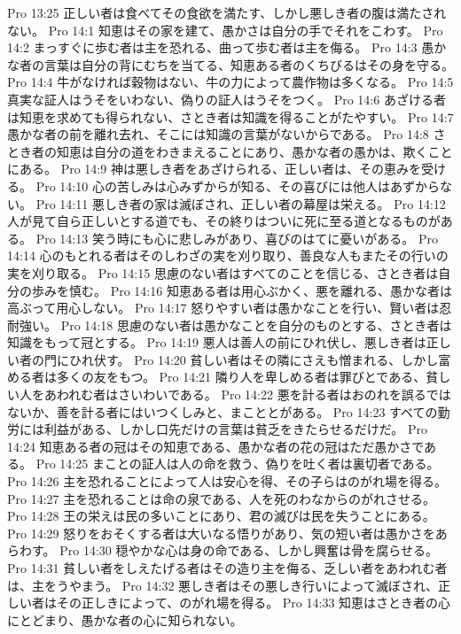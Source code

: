 Pro 13:25  正しい者は食べてその食欲を満たす、しかし悪しき者の腹は満たされない。
Pro 14:1  知恵はその家を建て、愚かさは自分の手でそれをこわす。
Pro 14:2  まっすぐに歩む者は主を恐れる、曲って歩む者は主を侮る。
Pro 14:3  愚かな者の言葉は自分の背にむちを当てる、知恵ある者のくちびるはその身を守る。
Pro 14:4  牛がなければ穀物はない、牛の力によって農作物は多くなる。
Pro 14:5  真実な証人はうそをいわない、偽りの証人はうそをつく。
Pro 14:6  あざける者は知恵を求めても得られない、さとき者は知識を得ることがたやすい。
Pro 14:7  愚かな者の前を離れ去れ、そこには知識の言葉がないからである。
Pro 14:8  さとき者の知恵は自分の道をわきまえることにあり、愚かな者の愚かは、欺くことにある。
Pro 14:9  神は悪しき者をあざけられる、正しい者は、その恵みを受ける。
Pro 14:10  心の苦しみは心みずからが知る、その喜びには他人はあずからない。
Pro 14:11  悪しき者の家は滅ぼされ、正しい者の幕屋は栄える。
Pro 14:12  人が見て自ら正しいとする道でも、その終りはついに死に至る道となるものがある。
Pro 14:13  笑う時にも心に悲しみがあり、喜びのはてに憂いがある。
Pro 14:14  心のもとれる者はそのしわざの実を刈り取り、善良な人もまたその行いの実を刈り取る。
Pro 14:15  思慮のない者はすべてのことを信じる、さとき者は自分の歩みを慎む。
Pro 14:16  知恵ある者は用心ぶかく、悪を離れる、愚かな者は高ぶって用心しない。
Pro 14:17  怒りやすい者は愚かなことを行い、賢い者は忍耐強い。
Pro 14:18  思慮のない者は愚かなことを自分のものとする、さとき者は知識をもって冠とする。
Pro 14:19  悪人は善人の前にひれ伏し、悪しき者は正しい者の門にひれ伏す。
Pro 14:20  貧しい者はその隣にさえも憎まれる、しかし富める者は多くの友をもつ。
Pro 14:21  隣り人を卑しめる者は罪びとである、貧しい人をあわれむ者はさいわいである。
Pro 14:22  悪を計る者はおのれを誤るではないか、善を計る者にはいつくしみと、まこととがある。
Pro 14:23  すべての勤労には利益がある、しかし口先だけの言葉は貧乏をきたらせるだけだ。
Pro 14:24  知恵ある者の冠はその知恵である、愚かな者の花の冠はただ愚かさである。
Pro 14:25  まことの証人は人の命を救う、偽りを吐く者は裏切者である。
Pro 14:26  主を恐れることによって人は安心を得、その子らはのがれ場を得る。
Pro 14:27  主を恐れることは命の泉である、人を死のわなからのがれさせる。
Pro 14:28  王の栄えは民の多いことにあり、君の滅びは民を失うことにある。
Pro 14:29  怒りをおそくする者は大いなる悟りがあり、気の短い者は愚かさをあらわす。
Pro 14:30  穏やかな心は身の命である、しかし興奮は骨を腐らせる。
Pro 14:31  貧しい者をしえたげる者はその造り主を侮る、乏しい者をあわれむ者は、主をうやまう。
Pro 14:32  悪しき者はその悪しき行いによって滅ぼされ、正しい者はその正しきによって、のがれ場を得る。
Pro 14:33  知恵はさとき者の心にとどまり、愚かな者の心に知られない。

